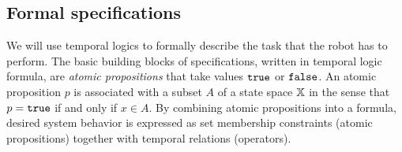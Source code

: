 \documentclass[conference]{IEEEtran}
\newcommand{\sofieNew}[1]{{\color{blue}#1}}
\begin{document}
\subsection{Formal specifications}
\sofieNew{We will use temporal logics to formally describe the task that the robot has to perform.}
The basic building blocks of specifications, written in temporal logic formula, are \emph{atomic propositions} that take values $\texttt{true}$ or $\texttt{false}$.  An atomic proposition $p$ is associated with a subset $A$ of a state space $\mathbb{X}$ in the sense that $p = \texttt{true}$ if and only if $x \in A$. 
By combining atomic propositions into a formula, desired system behavior is expressed as set membership constraints (atomic propositions) together with temporal relations (operators).
\end{document}
